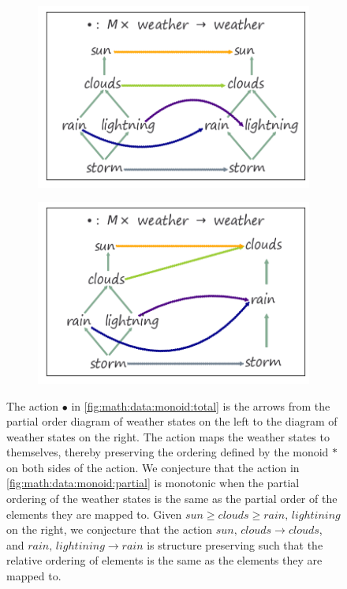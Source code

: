 \documentclass[../main.tex]{subfiles}
\begin{document}
\begin{figure}[H]
    \begin{subfigure}{.49\textwidth}
        \includegraphics[width=\textwidth]{figures/math/monoid_total.png}
        \caption{}
        \label{fig:math:data:monoid:total}
    \end{subfigure}
    \begin{subfigure}{.49\textwidth}
        \includegraphics[width=1\textwidth]{figures/math/monoid_partial.png}
        \caption{}
        \label{fig:math:data:monoid:partial}
    \end{subfigure}
    \caption{The action $\bullet$ in \autoref{fig:math:data:monoid:total} is the arrows from the partial order diagram of weather states on the left to the diagram of weather states on the right. The action maps the weather states to themselves, thereby preserving the ordering defined by the monoid $\ast$ on both sides of the action. We conjecture that the action in \autoref{fig:math:data:monoid:partial} is monotonic when the partial ordering of the weather states is the same as the partial order of the elements they are mapped to. Given $sun \geq clouds\geq rain,\, lightining$ on the right, we conjecture that the action  $sun,\, clouds \rightarrow clouds$, and $rain,\, lightining \rightarrow rain$ is structure preserving such that the relative ordering of elements is the same as the elements they are mapped to.}
    \label{fig:math:data:monoid}
\end{figure}
\end{document}
